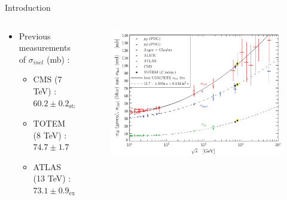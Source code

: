 \documentclass[aspectratio=169,xcolor=dvipsnames]{beamer}
\begin{document}
\begin{frame}{Introduction}
	\begin{columns}[T]
		\begin{column}{0.6\textwidth}
				\begin{itemize}
				\item Previous measurements of $\sigma_{inel}$ (mb) :
				\begin{itemize}
					\item CMS (7 TeV) : $ 60.2 \pm 0.2_\text{stat.} \pm 1.1_\text{sys.} \pm 2.4_\text{lum.}  $
					\item TOTEM (8 TeV) : $ 74.7 \pm 1.7 $
					\item ATLAS (13 TeV) : $ 73.1 \pm 0.9_\text{exp.} \pm 6.6_\text{lum.} \pm 3.8_\text{ext.}$
				\end{itemize} \vspace{0.1in}
			\end{itemize}
		\end{column}
		\begin{column}{.4\textwidth}
			\begin{figure}
				\centering
				\includegraphics[width=\linewidth]{screenshot004}
 
			\end{figure}
		\end{column}
	\end{columns}

\end{frame}
\end{document}
